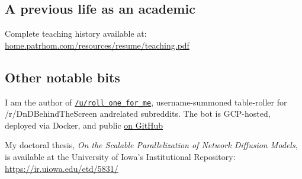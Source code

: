 \documentclass[10pt,letterpaper]{article}
\newcommand\ttt\texttt
\renewenvironment{itemize}{
  \begin{list}{}{
    \setlength{\leftmargin}{1.5em}
    \setlength{\itemsep}{0.25em}
    \setlength{\parskip}{0pt}
    \setlength{\parsep}{0.25em}
  }
}{
  \end{list}
}
\begin{document}
\subsection*{A previous life as an academic}
\begin{itemize}
  \item

  \item

  \item

  \item

  \item Complete teaching history available at: \url{home.patrhom.com/resources/resume/teaching.pdf}
\end{itemize}

\subsection*{Other notable bits}
\begin{itemize}
  \item I am the author of \href{https://www.reddit.com/user/roll_one_for_me}{\ttt{/u/roll\_one\_for\_me}},
    username-summoned table-roller for /r/DnDBehindTheScreen andrelated subreddits.
    The bot is GCP-hosted, deployed via Docker,
    and public \href{https://github.com/PurelyApplied/roll_one_for_me/}{on GitHub}

  \item My doctoral thesis, {\em On the Scalable Parallelization of Network Diffusion Models},
    is available at the University of Iowa's Institutional Repository:  \url{https://ir.uiowa.edu/etd/5831/}
\end{itemize}
\end{document}
